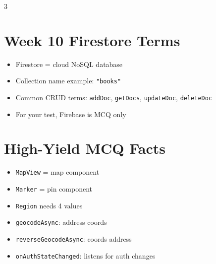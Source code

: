 \documentclass[10pt,letterpaper]{article}
\begin{document}
\begin{multicols}{3}
\section*{Week 10 Firestore Terms}
\begin{itemize}
  \item Firestore = cloud NoSQL database
  \item Collection name example: \texttt{"books"}
  \item Common CRUD terms: \texttt{addDoc}, \texttt{getDocs}, \texttt{updateDoc}, \texttt{deleteDoc}
  \item For your test, Firebase is MCQ only
\end{itemize}

\section*{High-Yield MCQ Facts}
\begin{itemize}
  \item \texttt{MapView} = map component
  \item \texttt{Marker} = pin component
  \item \texttt{Region} needs 4 values
  \item \texttt{geocodeAsync}: address \textrightarrow{} coords
  \item \texttt{reverseGeocodeAsync}: coords \textrightarrow{} address
  \item \texttt{onAuthStateChanged}: listens for auth changes
\end{itemize}

\end{multicols}
\end{document}
